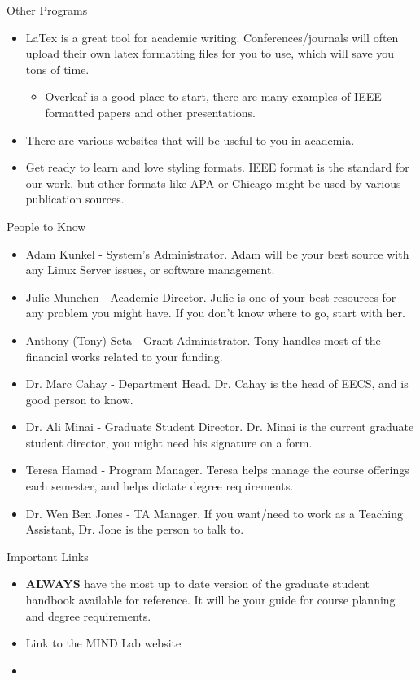 \documentclass[handout]{beamer}
\begin{document}
\begin{frame}{Other Programs}
\begin{itemize}
  \item LaTex is a great tool for academic writing. Conferences/journals will often upload their own latex formatting files for you to use, which will save you tons of time. 
  \begin{itemize}
      \item Overleaf is a good place to start, there are many examples of IEEE formatted papers and other presentations.
  \end{itemize}
  \item There are various websites that will be useful to you in academia. 
  \item Get ready to learn and love styling formats. IEEE format is the standard for our work, but other formats like APA or Chicago might be used by various publication sources.
\end{itemize}
\end{frame}

\begin{frame}{People to Know}
\begin{itemize}
  \item Adam Kunkel - System's Administrator. Adam will be your best source with any Linux Server issues, or software management.
  \item Julie Munchen - Academic Director. Julie is one of your best resources for any problem you might have. If you don't know where to go, start with her.
  \item Anthony (Tony) Seta - Grant Administrator. Tony handles most of the financial works related to your funding. 
  \item Dr. Marc Cahay - Department Head. Dr. Cahay is the head of EECS, and is good person to know.
  \item Dr. Ali Minai - Graduate Student Director. Dr. Minai is the current graduate student director, you might need his signature on a form.
  \item Teresa Hamad - Program Manager. Teresa helps manage the course offerings each semester, and helps dictate degree requirements.
  \item Dr. Wen Ben Jones - TA Manager. If you want/need to work as a Teaching Assistant, Dr. Jone is the person to talk to.
\end{itemize}
\end{frame}

\begin{frame}{Important Links}
\begin{itemize}
  \item \textbf{ALWAYS} have the most up to date version of the graduate student handbook available for reference. It will be your guide for course planning and degree requirements.
  \item Link to the MIND Lab website
  \item 
\end{itemize}
\end{frame}
\end{document}
